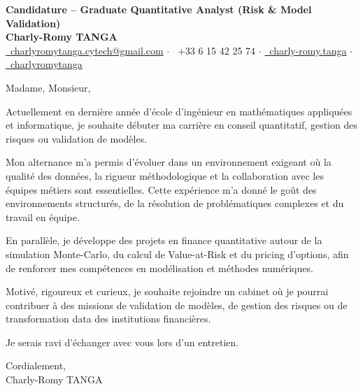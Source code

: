 \documentclass[10pt, letterpaper]{article}
\begin{document}
\begin{center}
    \textbf{\LARGE Candidature -- Graduate Quantitative Analyst (Risk \& Model Validation)} \\[0.2cm]
    \textbf{\large Charly-Romy TANGA} \\[0.2cm]
    \href{mailto:charlyromytanga.cytech@gmail.com}{\faEnvelope\ charlyromytanga.cytech@gmail.com}
    \quad$\cdot$\quad
    \faPhone\ +33 6 15 42 25 74
    \quad$\cdot$\quad
    \href{https://www.linkedin.com/in/charly-romy-tanga}{\faLinkedin\ charly-romy.tanga}
    \quad$\cdot$\quad
    \href{https://github.com/charlyromytanga}{\faGithub\ charlyromytanga}
\end{center}

Madame, Monsieur,

Actuellement en dernière année d'école d'ingénieur en mathématiques appliquées et informatique, je souhaite débuter ma carrière en conseil quantitatif, gestion des risques ou validation de modèles.

Mon alternance m'a permis d'évoluer dans un environnement exigeant où la qualité des données, la rigueur méthodologique et la collaboration avec les équipes métiers sont essentielles. Cette expérience m'a donné le goût des environnements structurés, de la résolution de problématiques complexes et du travail en équipe.

En parallèle, je développe des projets en finance quantitative autour de la simulation Monte-Carlo, du calcul de Value-at-Risk et du pricing d'options, afin de renforcer mes compétences en modélisation et méthodes numériques.

Motivé, rigoureux et curieux, je souhaite rejoindre un cabinet où je pourrai contribuer à des missions de validation de modèles, de gestion des risques ou de transformation data des institutions financières.

Je serais ravi d'échanger avec vous lors d'un entretien.

Cordialement,\\
Charly-Romy TANGA
\end{document}
